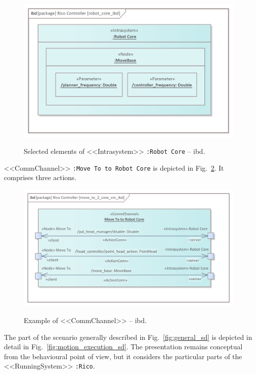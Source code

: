 \documentclass[11pt,oneside,a4paper]{article}
\begin{document}
	\begin{figure}[H]
		\centering
		\begin{center}
			{\includegraphics[scale=0.85]{img/rico_pkg/robot_core_ibd.png}}
		\end{center}
		\caption{Selected elements of <<Intrasystem>> \texttt{:Robot Core} -- ibd.} 
		\label{fig:robot_core_ibd}
	\end{figure}
	
			
	<<CommChannel>> \texttt{:Move To to Robot Core} is depicted in Fig.~\ref{fig:move_to_2_core_cm_ibd}. It comprises three actions.
	

	\begin{figure}[H]
		\centering
		\begin{center}
			{\includegraphics[scale=1.0]{img/rico_pkg/move_to_2_core_cm_ibd.png}}
		\end{center}
		\caption{Example of <<CommChannel>> -- ibd.} 
		\label{fig:move_to_2_core_cm_ibd}
	\end{figure}
	
		
	The part of the scenario generally described in Fig.~\ref{fig:general_sd} is depicted in detail in Fig.~\ref{fig:motion_execution_sd}. The presentation remains conceptual from the behavioural point of view, but it considers the particular parts of the <<RunningSystem>> \texttt{:Rico}.
	
\end{document}
